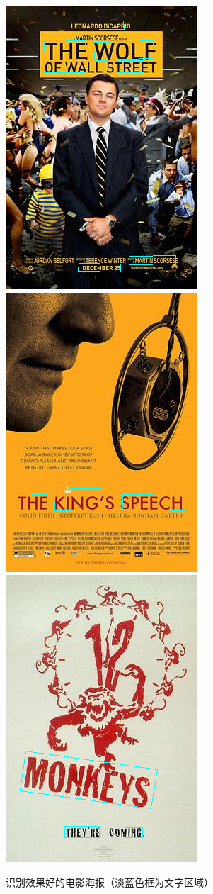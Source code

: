 \documentclass[main.tex]{subfiles}
\begin{document}
\begin{figure}
    \centering
    \includegraphics[width=0.3\linewidth]{images/poster_good_1.png}
    \includegraphics[width=0.3\linewidth]{images/poster_good_2.png}
    \includegraphics[width=0.3\linewidth]{images/poster_good_3.png}
    \caption{识别效果好的电影海报（淡蓝色框为文字区域）}
    \label{fig:poster-good-for-ocr}
\end{figure}
\end{document}
